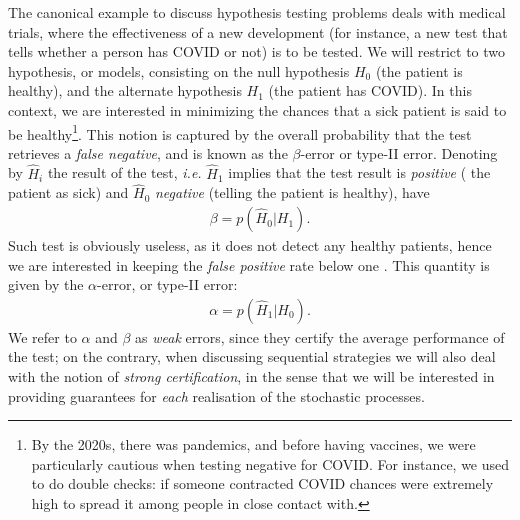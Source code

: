 The canonical example to discuss hypothesis testing problems deals with medical trials, where the effectiveness of a new development (for instance, a new test that tells whether a person has COVID or not) is to be tested. We will restrict to two hypothesis, or models, consisting on the null hypothesis $H_0$ (the patient is healthy), and the alternate hypothesis $H_1$ (the patient has COVID). In this context, we are interested in minimizing the chances that a sick patient is said to be healthy\footnote{By the 2020s, there was pandemics, and before having vaccines, we were particularly cautious when testing negative for COVID. For instance, we used to do double checks: if someone contracted COVID chances were extremely high to spread it among people in close contact with.}. This notion is captured by the overall probability that the test retrieves a \textit{false negative}, and is known as the $\beta$-error or type-II error. Denoting by $\hat{H}_i$ the result of the test, \textit{i.e.} $\hat{H}_1$ implies that the test result is \textit{positive} ( the patient as sick) and $\hat{H}_0$ \textit{negative} (telling the patient is healthy), have
\begin{align}
\beta = p(\hat{H}_0|H_1).
\end{align}
 Such test is obviously useless, as it does not detect any healthy patients, hence we are interested in keeping the \textit{false positive} rate below one . This quantity is given by the $\alpha$-error, or type-II error:
\begin{align}
\alpha = p(\hat{H}_1|H_0).
\end{align}
We refer to $\alpha$ and $\beta$ as \textit{weak} errors, since they certify the average performance of the test; on the contrary, when discussing sequential strategies we will also deal with the notion of \textit{strong certification}, in the sense that we will be interested in providing guarantees for \textit{each} realisation of the stochastic processes.

